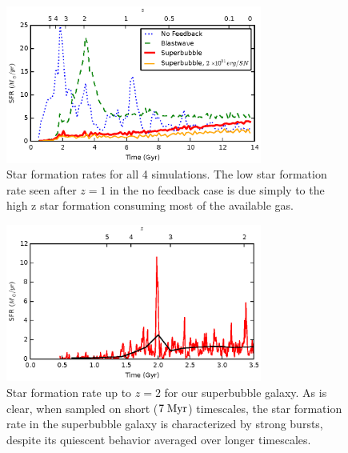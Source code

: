 \begin{figure}
    \includegraphics[width=0.75\textwidth]{figures2/sfr.eps}
    \caption[Star formation rate as a function of feedback model]{Star formation
    rates for all 4 simulations.  The low star formation rate seen after $z=1$
    in the no feedback case is due simply to the high z star formation consuming
    most of the available gas.}
    \label{sfr2}
\end{figure}
\begin{figure}
    \includegraphics[width=0.75\textwidth]{figures2/burstiness.eps}
    \caption[Superbubble star formation burstiness]{Star formation rate up to
    $z=2$ for our superbubble galaxy.  As is clear, when sampled on short ($7\;
    \rm{Myr}$) timescales, the star formation rate in the superbubble galaxy is
    characterized by strong bursts, despite its quiescent behavior averaged over
    longer timescales.}
    \label{burstiness2}
\end{figure}
